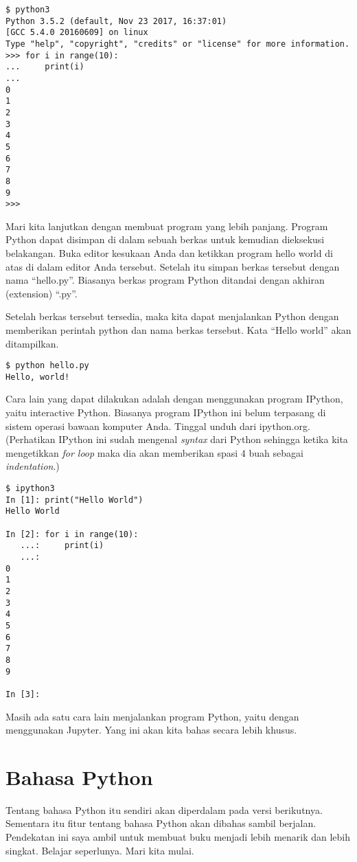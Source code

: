 \begin{verbatim}
$ python3
Python 3.5.2 (default, Nov 23 2017, 16:37:01) 
[GCC 5.4.0 20160609] on linux
Type "help", "copyright", "credits" or "license" for more information.
>>> for i in range(10):
...     print(i)
... 
0
1
2
3
4
5
6
7
8
9
>>> 
\end{verbatim}


Mari kita lanjutkan dengan membuat program yang lebih panjang. Program Python
dapat disimpan di dalam sebuah berkas untuk kemudian dieksekusi belakangan.
Buka editor kesukaan Anda dan ketikkan program hello world di atas di dalam
editor Anda tersebut. Setelah itu simpan berkas tersebut dengan nama
``hello.py''. Biasanya berkas program Python ditandai dengan akhiran
(extension) ``.py''.

Setelah berkas tersebut tersedia, maka kita dapat menjalankan Python dengan
memberikan perintah python dan nama berkas tersebut. 
Kata ``Hello world'' akan ditampilkan.

\begin{verbatim}
$ python hello.py
Hello, world!
\end{verbatim}

Cara lain yang dapat dilakukan adalah dengan menggunakan program IPython,
yaitu interactive Python. Biasanya program IPython ini belum terpasang di
sistem operasi bawaan komputer Anda. Tinggal unduh dari ipython.org.
(Perhatikan IPython ini sudah mengenal {\em syntax} dari Python sehingga 
ketika kita mengetikkan {\em for loop} maka dia akan memberikan spasi 4 buah
sebagai {\em indentation}.)

\begin{verbatim}
$ ipython3
In [1]: print("Hello World")
Hello World

In [2]: for i in range(10):
   ...:     print(i)
   ...:     
0
1
2
3
4
5
6
7
8
9

In [3]: 
\end{verbatim}

Masih ada satu cara lain menjalankan program Python, yaitu dengan menggunakan
Jupyter. Yang ini akan kita bahas secara lebih khusus.

\section{Bahasa Python} 
Tentang bahasa Python itu sendiri akan diperdalam pada versi berikutnya.
Sementara itu fitur tentang bahasa Python akan dibahas sambil berjalan.
Pendekatan ini saya ambil untuk membuat buku menjadi lebih menarik dan lebih
singkat. Belajar seperlunya. Mari kita mulai.

